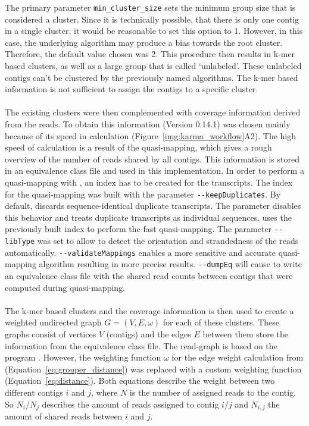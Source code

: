 \documentclass[12pt,a4paper,english]{article}
\begin{document}
	The primary parameter \texttt{min\_cluster\_size} sets the minimum group size that is considered a cluster. Since it is technically possible, that there is only one contig in a single cluster, it would be reasonable to set this option to 1. However, in this case, the underlying algorithm may produce a bias towards the root cluster. Therefore, the default value chosen was 2.
	This procedure then results in k-mer based clusters, as well as a large group that is called `unlabeled'. These unlabeled contigs can't be clustered by the previously named algorithms. The k-mer based information is not sufficient to assign the contigs to a specific cluster. \\
	\\
	The existing clusters were then complemented with coverage information derived from the reads. To obtain this information \salmon (Version 0.14.1) \citep{salmon:17} was chosen mainly because of its speed in calculation (Figure~\ref{img:karma_workflow}A2). 
	The high speed of calculation is a result of the quasi-mapping, which gives a rough overview of the number of reads shared by all contigs. This information is stored in an equivalence class file and used in this implementation.
	In order to perform a quasi-mapping with \salmon, an index has to be created for the transcripts. The index for the quasi-mapping was built with the parameter \texttt{-{}-keepDuplicates}. By default, \salmon discards sequence-identical duplicate transcripts. The parameter disables this behavior and treats duplicate transcripts as individual sequences.
	\salmon uses the previously built index to perform the fast quasi-mapping. The parameter \texttt{-{}-libType} was set to allow \salmon to detect the orientation and strandedness of the reads automatically.
	\texttt{-{}-validateMappings} enables a more sensitive and accurate quasi-mapping algorithm resulting in more precise results. \texttt{-{}-dumpEq} will cause \salmon to write an equivalence class file with the shared read counts between contigs that were computed during quasi-mapping.\\
\\
	The k-mer based clusters and the coverage information is then used to create a weighted undirected graph $ G = (V, E, \omega) $ for each of these clusters. These graphs consist of vertices $V$ (contigs) and the edges $E$ between them store the information from the \salmon equivalence class file. The read-graph is based on the program \grouper \citep{Grouper:18}. However, the weighting function $\omega$ for the edge weight calculation from \grouper (Equation~\ref{eq:grouper_distance}) was replaced with a custom weighting function (Equation~\ref{eq:distance}). Both equations describe the weight between two different contigs $ i $ and $ j $, where $ N $ is the number of assigned reads to the contig. So $N_{i}$/$N_{j}$ describes the amount of reads assigned to contig $i$/$j$ and $ N_{i,j}$ the amount of shared reads between $i$ and $j$.
\end{document}
